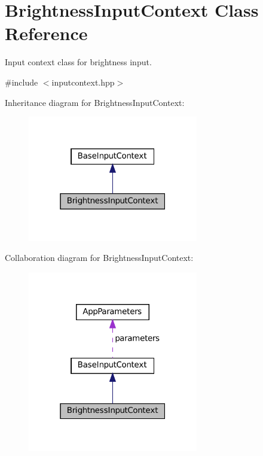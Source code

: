 \hypertarget{classBrightnessInputContext}{}\section{Brightness\+Input\+Context Class Reference}
\label{classBrightnessInputContext}


Input context class for brightness input.  




{\ttfamily \#include $<$inputcontext.\+hpp$>$}



Inheritance diagram for Brightness\+Input\+Context\+:\nopagebreak
\begin{figure}[H]
\begin{center}
\leavevmode
\includegraphics[width=211pt]{classBrightnessInputContext__inherit__graph}
\end{center}
\end{figure}


Collaboration diagram for Brightness\+Input\+Context\+:\nopagebreak
\begin{figure}[H]
\begin{center}
\leavevmode
\includegraphics[width=211pt]{classBrightnessInputContext__coll__graph}
\end{center}
\end{figure}
